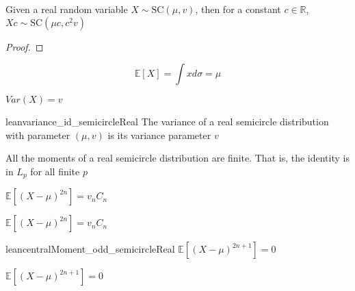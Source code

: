 \begin{lemma}\label{lem:semicircleReal_mul_const}
  \mathlibok
   Given a real random variable $X \sim \mathrm{SC}(\mu, v)$,
  then for a constant $c \in \mathbb{R}$, $Xc \sim \mathrm{SC}(\mu c , c^2v)$
  \begin{proof}

  \end{proof}
\end{lemma}






\begin{lemma}\label{lem:integral_id_semicircleReal}
  \notready
  $$\mathbb{E}[X] = \int x d \sigma = \mu$$
\end{lemma}

\begin{lemma}\label{lem:variance_fun_id_semicircleReal}
  \notready
  $Var(X) = v$
\end{lemma}


\begin{lemma}\label{lem:variance_id_semicircleReal}
  lean{variance_id_semicircleReal}
  \notready
  The variance of a real semicircle distribution with parameter $(\mu, v)$ is
  its variance parameter $v$
\end{lemma}


\begin{lemma}\label{lem:memLp_id_semicircleReal}
  \notready
  All the moments of a real semicircle distribution are finite. That is, the identity is in $L_p$ for
  all finite $p$
\end{lemma}


\begin{lemma}\label{lem:centralMoment_two_mul_semicircleReal}
  \notready
   $\mathbb{E}[(X  - \mu)^{2n}] = v_n C_n $
\end{lemma}

\begin{lemma}\label{lem:centralMoment_fun_two_mul_semicircleReal}
  \notready
   $\mathbb{E}[(X  - \mu)^{2n}] = v_n C_n $
\end{lemma}

\begin{lemma}\label{lem:centralMoment_odd_semicircleReal}
  lean{centralMoment_odd_semicircleReal}
  \notready
  $\mathbb{E}[(X  - \mu)^{2n + 1}] = 0 $
\end{lemma}

\begin{lemma}\label{lem:centralMoment_fun_odd_semicircleReal}
  \notready
   $\mathbb{E}[(X  - \mu)^{2n + 1}] = 0 $
\end{lemma}

